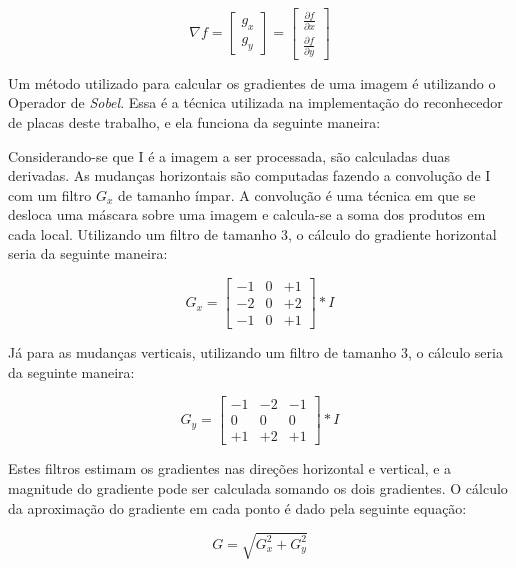 \begin{displaymath}
\nabla f={\begin{bmatrix}g_{x}\\g_{y}\end{bmatrix}}={\begin{bmatrix}{\frac {\partial f}{\partial x}}\\{\frac {\partial f}{\partial y}}\end{bmatrix}}
\end{displaymath}

Um método utilizado para calcular os gradientes de uma imagem é utilizando o
Operador de \emph{Sobel}. Essa é a técnica utilizada na implementação do
reconhecedor de placas deste trabalho, e ela funciona da seguinte maneira:

Considerando-se que I é a imagem a ser processada, são calculadas duas
derivadas. As mudanças horizontais são computadas fazendo a convolução de I com
um filtro $G_{x}$ de tamanho ímpar. A convolução é uma técnica em que se desloca
uma máscara sobre uma imagem e calcula-se a soma dos produtos em cada local.
Utilizando um filtro de tamanho 3, o cálculo do gradiente horizontal seria da
seguinte maneira:

\begin{displaymath}
G_{x} = \begin{bmatrix}
-1 & 0 & +1  \\
-2 & 0 & +2  \\
-1 & 0 & +1
\end{bmatrix} * I
\end{displaymath}

Já para as mudanças verticais, utilizando um filtro de tamanho 3, o cálculo
seria da seguinte maneira:

\begin{displaymath}
G_{y} = \begin{bmatrix}
-1 & -2 & -1  \\
0 & 0 & 0  \\
+1 & +2 & +1
\end{bmatrix} * I
\end{displaymath}

Estes filtros estimam os gradientes nas direções horizontal e vertical, e a
magnitude do gradiente pode ser calculada somando os dois gradientes. O cálculo
da aproximação do gradiente em cada ponto é dado pela seguinte equação:

\begin{displaymath}
	G = \sqrt{G_{x}^{2} + G_{y}^{2}}
\end{displaymath}

